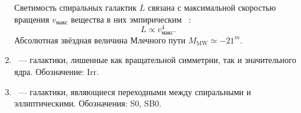 \begin{enumerate}[itemsep=3pt, label={\arabic*.}, leftmargin=1pc]
{	Светимость спиральных галактик $L$ связана с  максимальной скоростью вращения $v_\text{макс}$ вещества в них эмпирическим ~\cite{tully_fisher}\cite{tully_fisher_correction}:
	\begin{equation}
		L \propto v_\text{макс}^4.
	\end{equation}
	Абсолютная звёздная величина Млечного пути $M_\text{MW} \simeq -21^m$.}
	\item{~--- галактики, лишенные как вращательной симметрии, так и значительного ядра. Обозначение: Irr.}
	\item{~--- галактики, являющиеся переходными между спиральными и эллиптическими. Обозначения: S0, SB0.}
\end{enumerate}

